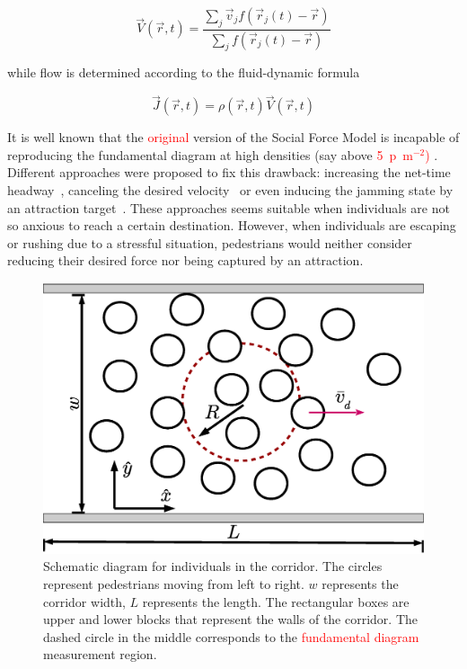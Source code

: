 \documentclass[preprint,12pt]{elsarticle}
\begin{document}
\begin{equation}
\vec{V}(\vec{r},t)=\frac{\sum_j \vec{v}_jf(\vec{r}_j(t)-\vec{r}) }{\sum_j f(\vec{r}_j(t)-\vec{r}) } \label{ec-v}
\end{equation}

while flow is determined according to the fluid-dynamic formula

\begin{equation}
\vec{J}(\vec{r},t)=\rho(\vec{r},t)\vec{V}(\vec{r},t) \label{ec-flow}
\end{equation}

It is well known that the \textcolor{red}{original} version of the Social Force 
Model  is incapable of reproducing the 
fundamental diagram at high densities (say above 
\textcolor{red}{5~p~m$^{-2}$)} \textcolor{red}{\cite{parisi2}} . Different 
approaches were proposed to fix this drawback: increasing the net-time 
headway~\cite{johansson}, canceling the desired velocity~\cite{parisi2} or even 
inducing the jamming state by an attraction target~\cite{kwak}. These approaches 
seems suitable when individuals are not so anxious to reach a certain 
destination. However, when individuals are escaping or rushing due to a 
stressful situation, pedestrians would neither consider reducing their desired 
force nor being captured by an attraction. \\

\begin{figure}[htbp!]
\centering
\includegraphics[width=0.7\columnwidth]
{./corridor.eps}
\caption{\label{corridor} Schematic diagram for individuals in the corridor. 
The circles represent pedestrians moving from left to right. $w$ represents the 
corridor width, $L$ represents the length. The rectangular boxes are upper and 
lower blocks that represent the walls of the corridor. The dashed circle in the 
middle corresponds to the \textcolor{red}{fundamental diagram} measurement region.}
\end{figure}
\end{document}
